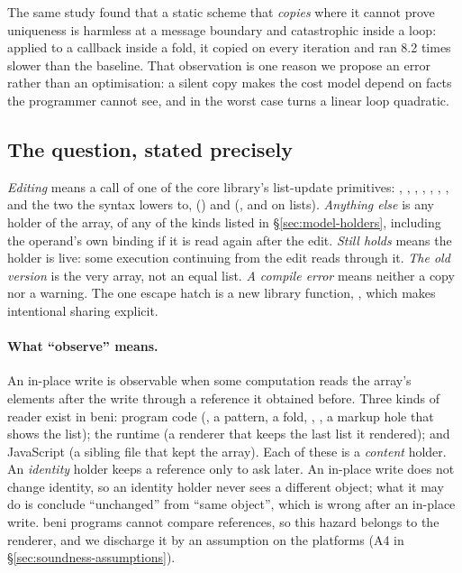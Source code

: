 The same study found that a static scheme that \emph{copies} where it cannot prove uniqueness is
harmless at a message boundary and catastrophic inside a loop: applied to a callback inside a fold,
it copied on every iteration and ran 8.2 times slower than the baseline. That observation is one
reason we propose an error rather than an optimisation: a silent copy makes the cost model depend
on facts the programmer cannot see, and in the worst case turns a linear loop quadratic.

\subsection{The question, stated precisely}
\label{sec:bg-question}

\emph{Editing} means a call of one of the core library's list-update primitives: ,
, , , , , , and the two
the syntax lowers to,  (\code{[ x, …xs ]}) and  (\code{[ …xs, …ys ]}, and
\code{++} on lists). \emph{Anything else} is any holder of the array, of any of the kinds listed in
\S\ref{sec:model-holders}, including the operand's own binding if it is read again after the edit.
\emph{Still holds} means the holder is live: some execution continuing from the edit reads through
it. \emph{The old version} is the very array, not an equal list. \emph{A compile error} means
neither a copy nor a warning. The one escape hatch is a new library function, ,
which makes intentional sharing explicit.

\paragraph{What ``observe'' means.} An in-place write is observable when some computation reads
the array's elements after the write through a reference it obtained before. Three kinds of reader
exist in beni: program code (, a pattern, a fold, \code{==}, , a
markup hole that shows the list); the runtime (a renderer that keeps the last list it rendered); and
JavaScript (a sibling file that kept the array). Each of these is a \emph{content} holder. An
\emph{identity} holder keeps a reference only to ask \code{===} later. An in-place write does not
change identity, so an identity holder never sees a different object; what it may do is conclude
``unchanged'' from ``same object'', which is wrong after an in-place write. beni programs cannot
compare references, so this hazard belongs to the renderer, and we discharge it by an assumption on
the platforms (A4 in \S\ref{sec:soundness-assumptions}).

